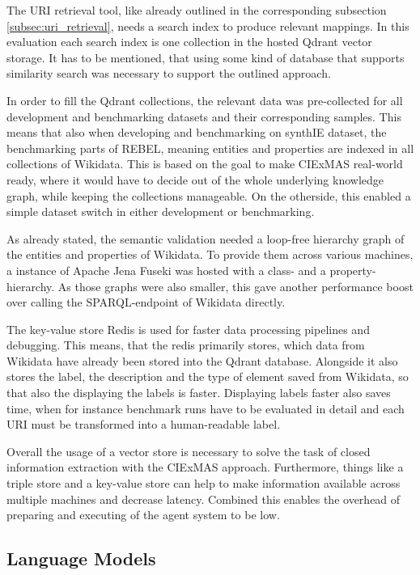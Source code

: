 \documentclass[a4paper,oneside,bibliography=totoc]{scrbook}
\begin{document}
The URI retrieval tool, like already outlined in the corresponding subsection \ref{subsec:uri_retrieval}, needs a search index to produce relevant mappings. In this evaluation each search index is one collection in the hosted Qdrant vector storage. It has to be mentioned, that using some kind of database that supports similarity search was necessary to support the outlined approach.

In order to fill the Qdrant collections, the relevant data was pre-collected for all development and benchmarking datasets and their corresponding samples. This means that also when developing and benchmarking on synthIE dataset, the benchmarking parts of REBEL, meaning entities and properties are indexed in all collections of Wikidata. This is based on the goal to make CIExMAS real-world ready, where it would have to decide out of the whole underlying knowledge graph, while keeping the collections manageable. On the otherside, this enabled a simple dataset switch in either development or benchmarking.

As already stated, the semantic validation needed a loop-free hierarchy graph of the entities and properties of Wikidata. To provide them across various machines, a instance of Apache Jena Fuseki was hosted with a class- and a property-hierarchy. As those graphs were also smaller, this gave another performance boost over calling the SPARQL-endpoint of Wikidata directly.

The key-value store Redis is used for faster data processing pipelines and debugging. This means, that the redis primarily stores, which data from Wikidata have already been stored into the Qdrant database. Alongside it also stores the label, the description and the type of element saved from Wikidata, so that also the displaying the labels is faster. Displaying labels faster also saves time, when for instance benchmark runs have to be evaluated in detail and each URI must be transformed into a human-readable label.

Overall the usage of a vector store is necessary to solve the task of closed information extraction with the CIExMAS approach. Furthermore, things like a triple store and a key-value store can help to make information available across multiple machines and decrease latency. Combined this enables the overhead of preparing and executing of the agent system to be low.

\subsection{Language Models}
\label{subsec:eval_language_models}
\end{document}
